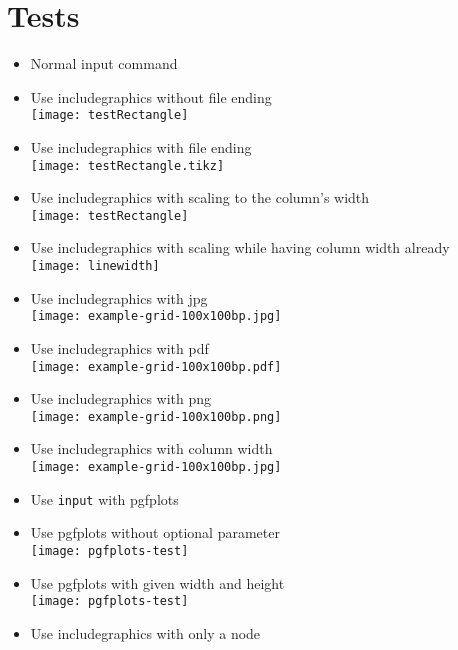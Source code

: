\documentclass[twocolumn]{article}
\begin{document}
	\section*{Tests}
	\begin{itemize}
		\item Normal input command\\%
		\item Use includegraphics without file ending\\%
			\texttt{[image: testRectangle]}%
		\item Use includegraphics with file ending\\%
			\texttt{[image: testRectangle.tikz]}%
		\item Use includegraphics with scaling to the column's width\\%
			\texttt{[image: testRectangle]}%
		\item Use includegraphics with scaling while having column width already\\%
			\texttt{[image: linewidth]}%
		\item Use includegraphics with jpg\\%
			\texttt{[image: example-grid-100x100bp.jpg]}%
		\item Use includegraphics with pdf\\%
			\texttt{[image: example-grid-100x100bp.pdf]}%
		\item Use includegraphics with png\\%
			\texttt{[image: example-grid-100x100bp.png]}%
		\item Use includegraphics with column width\\%
			\texttt{[image: example-grid-100x100bp.jpg]}%
		\item Use \texttt{input} with pgfplots\\%
		\item Use pgfplots without optional parameter\\%
			\texttt{[image: pgfplots-test]}%
		\item Use pgfplots with given width and height\\%
			\texttt{[image: pgfplots-test]}%
		\item Use includegraphics with only a node\\%

\end{itemize}
\end{document}
